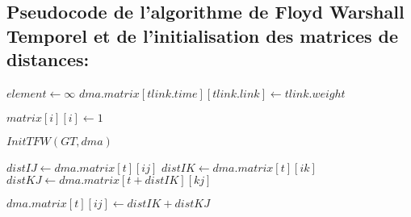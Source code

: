 \subsection{Pseudocode de l'algorithme de Floyd Warshall Temporel et de l'initialisation des matrices de distances:}


\begin{algorithm}[H]
 \caption{$InitTFW(graphe temporel \ GT, DistanceMatrixes \ dma$)}
    \begin{algorithmic}
        
   
			\State $element \gets \infty$
		\EndFor
	\EndFor
		\State $dma.matrix[tlink.time][tlink.link] \gets tlink.weight$ 
	\EndFor

			\State $matrix[i][i] \gets 1$
		\EndFor
	\EndFor
\end{algorithmic}
\end{algorithm}


\begin{algorithm}[H]
    \caption{$TemporalFloydWarshall(graphe temporel \ GT, DistanceMatrixes \ dma)$}
\begin{algorithmic}
	\State $InitTFW(GT, dma)$

				
					\State $distIJ \gets dma.matrix[t][ij]$
					\State $distIK \gets dma.matrix[t][ik]$
					\State $distKJ \gets dma.matrix[t+distIK][kj]$

						\State $dma.matrix[t][ij] \gets distIK + distKJ$
					\EndIf
				\EndFor
			\EndFor
		\EndFor
		

	\EndFor 
\end{algorithmic}
\end{algorithm}

